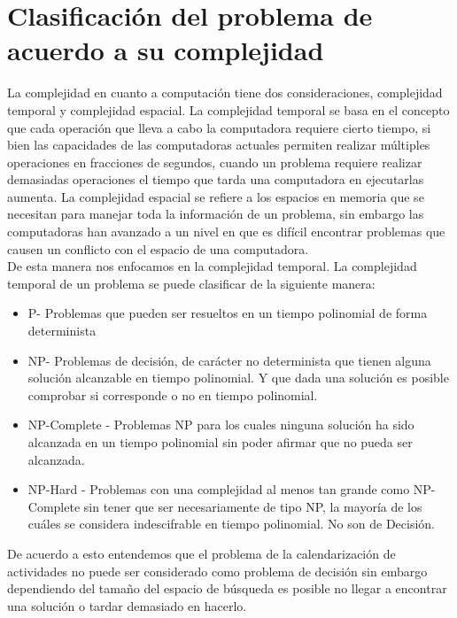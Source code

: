 	\section{Clasificación del problema de acuerdo a su complejidad}
	
	La complejidad en cuanto a computación tiene dos consideraciones, complejidad temporal y complejidad espacial. La complejidad temporal se basa en el concepto que cada operación que lleva a cabo la computadora requiere cierto tiempo, si bien las capacidades de las computadoras actuales permiten realizar múltiples operaciones en fracciones de segundos, cuando un problema requiere realizar demasiadas operaciones el tiempo que tarda una computadora en ejecutarlas aumenta. La complejidad espacial se refiere a los espacios en memoria que se necesitan para manejar toda la información de un problema, sin embargo las computadoras han avanzado a un nivel en que es difícil encontrar problemas que causen un conflicto con el espacio de una computadora.\\
	
	De esta manera nos enfocamos en la complejidad temporal. La complejidad temporal de un problema se puede clasificar de la siguiente manera: 
	
		\begin{itemize}
			\item P- Problemas que pueden ser resueltos en un tiempo polinomial de forma determinista
			
			\item NP- Problemas de decisión, de carácter no determinista que tienen alguna solución alcanzable en tiempo polinomial. Y que dada una solución es posible comprobar si corresponde o no en tiempo polinomial.
			
			\item NP-Complete - Problemas NP para los cuales ninguna solución ha sido alcanzada en un tiempo polinomial sin poder afirmar que no pueda ser alcanzada.
			
			\item NP-Hard - Problemas con una complejidad al menos tan grande como NP-Complete sin tener que ser necesariamente de tipo NP, la mayoría de los cuáles se considera indescifrable en tiempo polinomial. No son de Decisión.
			
		\end{itemize}
	De acuerdo a esto entendemos que el problema de la calendarización de actividades no puede ser considerado como problema de decisión sin embargo dependiendo del tamaño del espacio de búsqueda es posible no llegar a encontrar una solución o tardar demasiado en hacerlo.\\
	
